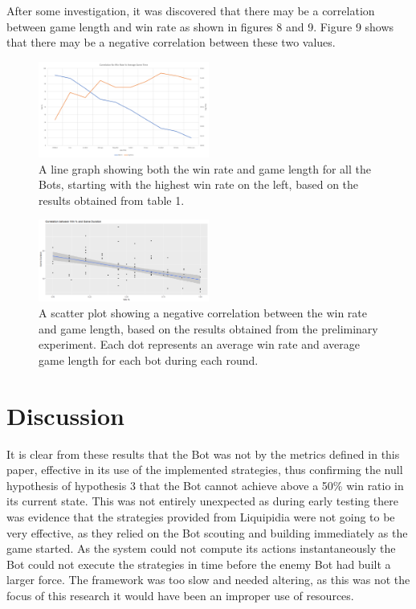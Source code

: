 \documentclass[journal]{IEEEtran}
\begin{document}
	After some investigation, it was discovered that there may be a correlation between game length and win rate as shown in figures 8 and 9. Figure 9 shows that there may be a negative correlation between these two values.
	\begin{figure}
		\centering
		\includegraphics[width=0.5\textwidth]{WinTimeLineWithBot}
		\caption{A line graph showing both the win rate and game length for all the Bots, starting with the highest win rate on the left, based on the results obtained from table 1.}
		\label{Fig7}
	\end{figure}
	\begin{figure}
		\centering
		\includegraphics[width=0.5\textwidth]{ScatterWinvsDurLine}
		\caption{A scatter plot showing a negative correlation between the win rate and game length, based on the results obtained from the preliminary experiment. Each dot represents an average win rate and average game length for each bot during each round.}
		\label{Fig8}
	\end{figure}
	\section{Discussion}
	It is clear from these results that the Bot was not by the metrics defined in this paper, effective in its use of the implemented strategies, thus confirming the null hypothesis of hypothesis 3 that the Bot cannot achieve above a 50\% win ratio in its current state. This was not entirely unexpected as during early testing there was evidence that the strategies provided from Liquipidia were not going to be very effective, as they relied on the Bot scouting and building immediately as the game started. As the system could not compute its actions instantaneously the Bot could not execute the strategies in time before the enemy Bot had built a larger force. The framework was too slow and needed altering, as this was not the focus of this research it would have been an improper use of resources.
	
\end{document}
